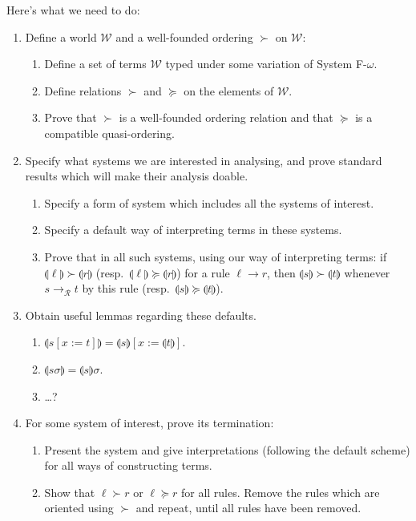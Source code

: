 \documentclass[runningheads,a4paper]{llncs}
\newcommand{\World}{\mathcal{W}}
\newcommand{\Rules}{\mathcal{R}}
\newcommand{\interpret}[1]{\llparenthesis #1 \rrparenthesis}
\newcommand{\arr}[1]{\to_{#1}}
\begin{document}
Here's what we need to do:
\begin{enumerate}
\item Define a world $\World$ and a well-founded ordering $\succ$ on
  $\World$:
  \begin{enumerate}
  \item Define a set of terms $\World$ typed under some variation of
    System F-$\omega$.
  \item Define relations $\succ$ and $\succeq$ on the elements of $\World$.
  \item Prove that $\succ$ is a well-founded ordering relation and that
    $\succeq$ is a compatible quasi-ordering.
  \end{enumerate}
\item Specify what systems we are interested in analysing, and prove
  standard results which will make their analysis doable.
  \begin{enumerate}
  \item Specify a form of system which includes all the systems of interest.
  \item Specify a default way of interpreting terms in these systems.
  \item Prove that in all such systems, using our way of interpreting
    terms: if $\interpret{\ell} \succ \interpret{r}$ (resp.\ $\interpret{
    \ell} \succeq \interpret{r}$) for a rule  $\ell \to r$, then
    $\interpret{s} \succ \interpret{t}$ whenever $s \arr{\Rules} t$ by
    this rule (resp.\ $\interpret{s} \succeq \interpret{t}$).
  \end{enumerate}
\item Obtain useful lemmas regarding these defaults.
  \begin{enumerate}
  \item $\interpret{s[x:=t]} = \interpret{s}[x:=\interpret{t}]$.
  \item $\interpret{s\sigma} = \interpret{s}\sigma$.
  \item \dots?
  \end{enumerate}
\item For some system of interest, prove its termination:
  \begin{enumerate}
  \item Present the system and give interpretations (following the
    default scheme) for all ways of constructing terms.
  \item Show that $\ell \succ r$ or $\ell \succeq r$ for all rules.
    Remove the rules which are oriented using $\succ$ and repeat,
    until all rules have been removed.
  \end{enumerate}
\end{enumerate}
\end{document}
